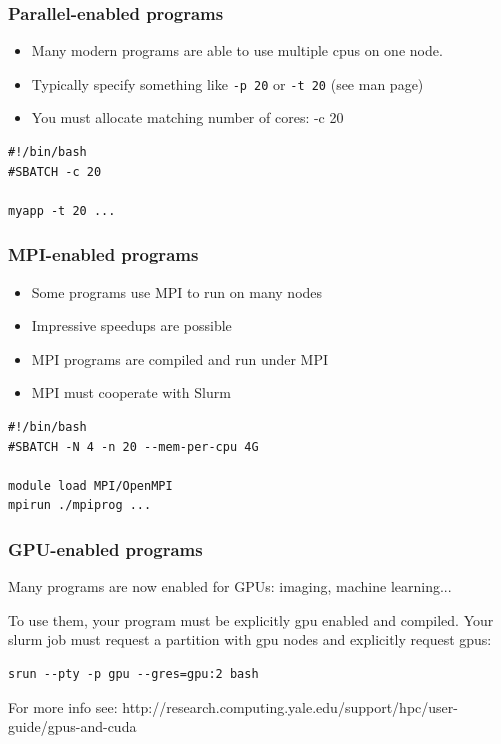 \documentclass[10pt]{beamer}
\begin{document}
\begin{frame}[fragile]
\frametitle{Parallel-enabled programs}
\begin{itemize}
\item Many modern programs are able to use multiple cpus on one node.
\item Typically specify something like \verb+-p 20+ or \verb+-t 20+ (see man page)
\item You must allocate matching number of cores: -c 20
\end{itemize}

\begin{block}{}
\begin{verbatim}
#!/bin/bash
#SBATCH -c 20

myapp -t 20 ...
\end{verbatim}
\end{block}{}
\end{frame}

\begin{frame}[fragile]
\frametitle{MPI-enabled programs}
\begin{itemize}
\item Some programs use MPI to run on many nodes
\item Impressive speedups are possible
\item MPI programs are compiled and run under MPI
\item MPI must cooperate with Slurm
\end{itemize}

\begin{block}{}
\begin{verbatim}
#!/bin/bash
#SBATCH -N 4 -n 20 --mem-per-cpu 4G

module load MPI/OpenMPI
mpirun ./mpiprog ...
\end{verbatim}
\end{block}{}
\end{frame}

\begin{frame}[fragile]
\frametitle{GPU-enabled programs}
Many programs are now enabled for GPUs: imaging, machine learning...

To use them, your program must be explicitly gpu enabled and compiled.
Your slurm job must request a partition with gpu nodes and explicitly request gpus:

\begin{verbatim}
srun --pty -p gpu --gres=gpu:2 bash
\end{verbatim}

For more info see:
http://research.computing.yale.edu/support/hpc/user-guide/gpus-and-cuda

\end{frame}
\end{document}
